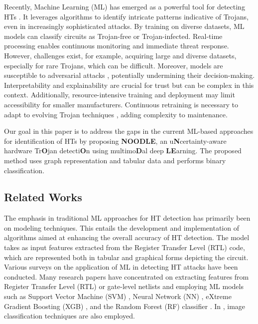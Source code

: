 Recently, Machine Learning (ML) has emerged as a powerful tool for detecting HTs \cite{gubbi2023hardware, huang2020survey, liakos2019machine, koblah2023survey, koylu2023survey}. %
It leverages algorithms to identify intricate patterns indicative of Trojans, even in increasingly sophisticated attacks. By training on diverse datasets, ML models can classify circuits as Trojan-free or Trojan-infected. Real-time processing enables continuous monitoring and immediate threat response. However, challenges exist, for example, acquiring large and diverse datasets, especially for rare Trojans, which can be difficult. Moreover, models are susceptible to adversarial attacks \cite{west2023towards}, potentially undermining their decision-making. Interpretability \cite{li2022interpretable} and explainability \cite{caruana2020intelligible} are crucial for trust but can be complex in this context. Additionally, resource-intensive training and deployment may limit accessibility for smaller manufacturers. Continuous retraining is necessary to adapt to evolving Trojan techniques \cite{Vishwakarma:ICCAD}, adding complexity to maintenance. 

Our goal in this paper is to address the gaps in the current ML-based approaches for identification of HTs by %
proposing \textbf{NOODLE}, an u\textbf{N}certainty-aware hardware Tr\textbf{O}jan detecti\textbf{O}n using multimo\textbf{D}al deep \textbf{LE}arning. The proposed method uses graph representation and tabular data and performs binary classification.

\subsection*{Related Works}
The emphasis in traditional ML approaches for HT detection has primarily been on modeling techniques. This entails the development and implementation of algorithms aimed at enhancing the overall accuracy of HT detection. The model takes as input features extracted from the Register Transfer Level (RTL) code, which are represented both in tabular and graphical forms depicting the circuit. Various surveys on the application of ML in detecting HT attacks have been conducted.  
Many research papers have concentrated on extracting features from Register Transfer Level (RTL) or gate-level netlists and employing ML models such as Support Vector Machine (SVM) \cite{bao2014application}, Neural Network (NN) \cite{hasegawa2017hardware}, eXtreme Gradient Boosting (XGB) \cite{dong2019machine}, and the Random Forest (RF) classifier \cite{hasegawa2017trojan}. In \cite{ashok2022hardware}, image classification techniques are also employed. %

